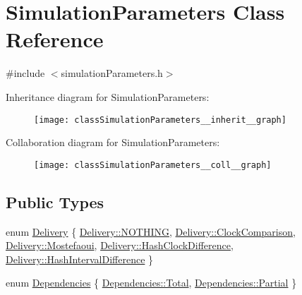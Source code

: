 \hypertarget{classSimulationParameters}{}\section{Simulation\+Parameters Class Reference}
\label{classSimulationParameters}


{\ttfamily \#include $<$simulation\+Parameters.\+h$>$}



Inheritance diagram for Simulation\+Parameters\+:\nopagebreak
\begin{figure}[H]
\begin{center}
\leavevmode
\texttt{[image: classSimulationParameters\_\_inherit\_\_graph]}
\end{center}
\end{figure}


Collaboration diagram for Simulation\+Parameters\+:\nopagebreak
\begin{figure}[H]
\begin{center}
\leavevmode
\texttt{[image: classSimulationParameters\_\_coll\_\_graph]}
\end{center}
\end{figure}
\subsection*{Public Types}
\begin{DoxyCompactItemize}
\item 
enum \hyperlink{classSimulationParameters_ae08444273809241f502aa422205f7307}{Delivery} \{ \newline
\hyperlink{classSimulationParameters_ae08444273809241f502aa422205f7307a8697250efc73639dd2a6e7da243ac68b}{Delivery\+::\+N\+O\+T\+H\+I\+NG}, 
\hyperlink{classSimulationParameters_ae08444273809241f502aa422205f7307a3ccf7e50009c796055e4814c7219f2df}{Delivery\+::\+Clock\+Comparison}, 
\hyperlink{classSimulationParameters_ae08444273809241f502aa422205f7307a59feb63389b0898ec47a4ab58d1be6f6}{Delivery\+::\+Mostefaoui}, 
\hyperlink{classSimulationParameters_ae08444273809241f502aa422205f7307a9a46ad9fb926b8b78ba9395f96aa6af0}{Delivery\+::\+Hash\+Clock\+Difference}, 
\newline
\hyperlink{classSimulationParameters_ae08444273809241f502aa422205f7307ae3d02f7a43cb7e3e7d667a67f84c3e32}{Delivery\+::\+Hash\+Interval\+Difference}
 \}
\item 
enum \hyperlink{classSimulationParameters_afb3b6aaecd4b19ef1991c870c8402dff}{Dependencies} \{ \hyperlink{classSimulationParameters_afb3b6aaecd4b19ef1991c870c8402dffa96b0141273eabab320119c467cdcaf17}{Dependencies\+::\+Total}, 
\hyperlink{classSimulationParameters_afb3b6aaecd4b19ef1991c870c8402dffa44ffd38a6dea695cbe2b34efdcc6cf27}{Dependencies\+::\+Partial}
 \}
\end{DoxyCompactItemize}
